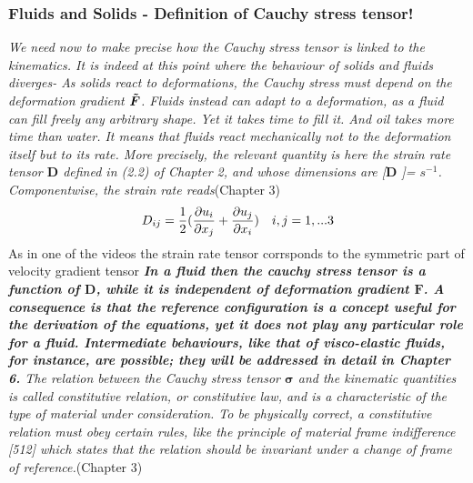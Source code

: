 \documentclass[11pt,letterpaper]{article}
\begin{document}
\subsubsection*{Fluids and Solids - Definition of Cauchy stress tensor!} \textit{We need now to make precise how the Cauchy stress tensor is linked to the kinematics. It is indeed at this point where the behaviour of solids and fluids diverges- As solids react to deformations, the Cauchy stress must depend on the deformation gradient $\bm{\Tilde{F}}$. 
Fluids instead can adapt to a deformation, as a fluid can fill freely any
arbitrary shape. Yet it takes time to fill it. And oil takes more time than water. It means that fluids react mechanically not to the deformation itself but to its rate. More precisely, the relevant quantity is here the strain rate tensor $\bm{D}$ defined in (2.2) of Chapter 2, and whose dimensions are [$\bm{D}$ ]= $s^{-1}$. Componentwise, the strain rate reads}(Chapter 3) 
\begin{equation}
    D_{ij} = \frac{1}{2} \large( \frac{\partial u_i}{\partial x_j} + \frac{\partial u_j}{\partial x_i} \large) \hspace{10pt} i,j=1,...3
\end{equation}
As in one of the videos the strain rate tensor corrsponds to the symmetric part of velocity gradient tensor
\textit{\textbf{In a fluid then  the cauchy stress tensor is a function of $\bm{D}$, while it is independent of  deformation gradient $\bm{F}$. A consequence is that the reference configuration is a concept useful for the derivation of the equations, yet it does not play any particular role for a fluid. Intermediate behaviours, like that of visco-elastic fluids, for instance, are possible; they will be addressed in detail in Chapter 6.} The relation between the Cauchy stress tensor $\bm{\sigma}$ and the kinematic quantities is called constitutive relation, or constitutive law, and is a characteristic of the type of material under consideration. To be physically correct, a constitutive relation must obey certain rules, like the principle of material frame indifference [512] which states that the relation should be invariant under a change of frame of reference.}(Chapter 3)
\end{document}
